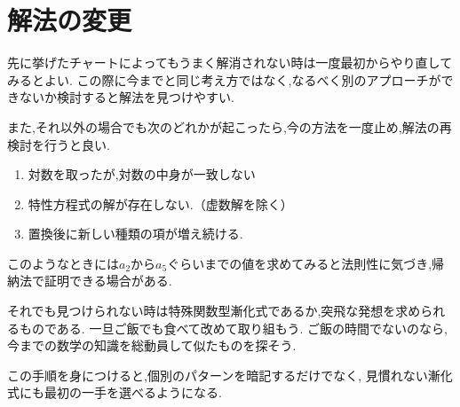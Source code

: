  \section{解法の変更}

  先に挙げたチャートによってもうまく解消されない時は一度最初からやり直してみるとよい.   
  この際に今までと同じ考え方ではなく,なるべく別のアプローチができないか検討すると解法を見つけやすい.

  また,それ以外の場合でも次のどれかが起こったら,今の方法を一度止め,解法の再検討を行うと良い.
  \begin{enumerate}
    \item 対数を取ったが,対数の中身が一致しない
    \item 特性方程式の解が存在しない.（虚数解を除く）
    \item 置換後に新しい種類の項が増え続ける.
  \end{enumerate}
  このようなときには$a_2$から$a_5$ぐらいまでの値を求めてみると法則性に気づき,帰納法で証明できる場合がある.
  

  それでも見つけられない時は特殊関数型漸化式であるか,突飛な発想を求められるものである.
  一旦ご飯でも食べて改めて取り組もう.
  ご飯の時間でないのなら,今までの数学の知識を総動員して似たものを探そう.
  
  この手順を身につけると,個別のパターンを暗記するだけでなく,
  見慣れない漸化式にも最初の一手を選べるようになる.